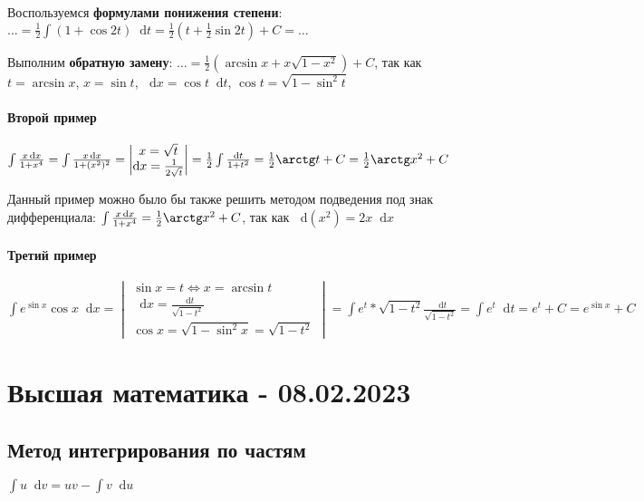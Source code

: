\documentclass{article}
\newcommand*\diff{\mathop{}\!\mathrm{d}}
\begin{document}
Воспользуемся \textbf{формулами понижения степени}: $\dots = \frac{1}{2} \int (1 + \cos 2 t) \diff t = \frac{1}{2} (t + \frac{1}{2} \sin 2t) + C = \dots$

Выполним \textbf{обратную замену}: $\dots = \frac{1}{2} (\arcsin x + x \sqrt{1 - x^2}) + C$, так как $t = \arcsin x$, $x = \sin t$, $\diff x = \cos t \diff t$, $\cos t = \sqrt{1 - \sin^2 t}$

\paragraph{Второй пример}

$\int \frac{x \diff x}{1 + x^4} = \int \frac{x \diff x}{1 + (x^2)^2} = \begin{vmatrix}
    x = \sqrt{t} \\
    \diff x = \frac{1}{2 \sqrt{t}}
\end{vmatrix} = \frac{1}{2} \int \frac{\diff t}{1 + t^2} = \frac{1}{2} \arctg t + C = \frac{1}{2} \arctg x^2 + C$

Данный пример можно было бы также решить методом подведения под знак дифференциала: $\int \frac{x \diff x}{1 + x^4} = \frac{1}{2} \arctg x^2 + C$, так как $\diff (x^2) = 2 x \diff x$

\paragraph{Третий пример}

$\int e^{\sin x} \cos x \diff x = \begin{vmatrix} 
    \sin x = t \Longleftrightarrow x = \arcsin t \\
    \diff x = \frac{\diff t}{\sqrt{1 - t^2}} \\
    \cos x = \sqrt{1 - \sin^2 x} = \sqrt{1 - t^2}
\end{vmatrix} = \int e^{t} * \sqrt{1 - t^2} \frac{\diff t}{\sqrt{1 - t^2}} = \int e^{t} \diff t = e^{t} + C = e^{\sin x} + C$

\pagebreak
\section{Высшая математика - 08.02.2023}

\subsection{Метод интегрирования по частям}

$\int u \diff v = u v - \int v \diff u$
\end{document}
